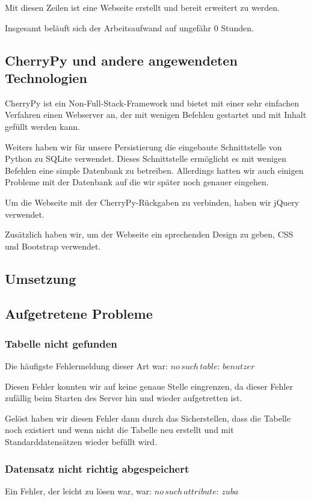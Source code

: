 Mit diesen Zeilen ist eine Webseite erstellt und bereit erweitert zu werden.

Insgesamt beläuft sich der Arbeitsaufwand auf ungefähr 0 Stunden.

\subsection{CherryPy und andere angewendeten Technologien}

CherryPy ist ein Non-Full-Stack-Framework und bietet mit einer sehr einfachen Verfahren einen Webserver an, der mit wenigen Befehlen gestartet und mit Inhalt gefüllt werden kann.

Weiters haben wir für unsere Persistierung die eingebaute Schnittstelle von Python zu SQLite verwendet. Dieses Schnittstelle ermöglicht es mit wenigen Befehlen eine simple Datenbank zu betreiben. Allerdings hatten wir auch einigen Probleme mit der Datenbank auf die wir später noch genauer eingehen.

Um die Webseite mit der CherryPy-Rückgaben zu verbinden, haben wir jQuery verwendet. 

Zusätzlich haben wir, um der Webseite ein sprechenden Design zu geben, CSS und Bootstrap verwendet. 


\subsection{Umsetzung}


\subsection{Aufgetretene Probleme}

\subsubsection{Tabelle nicht gefunden}
Die häufigste Fehlermeldung dieser Art war: $ no\,such\,table:\,benutzer $ 

Diesen Fehler konnten wir auf keine genaue Stelle eingrenzen, da dieser Fehler zufällig beim Starten des Server hin und wieder aufgetretten ist. 

Gelöst haben wir diesen Fehler dann durch das Sicherstellen, dass die Tabelle noch existiert und wenn nicht die Tabelle neu erstellt und mit Standarddatensätzen wieder befüllt wird.

\subsubsection{Datensatz nicht richtig abgespeichert}
Ein Fehler, der leicht zu lösen war, war: $ no\,such\,attribute:\,zuba $ 


